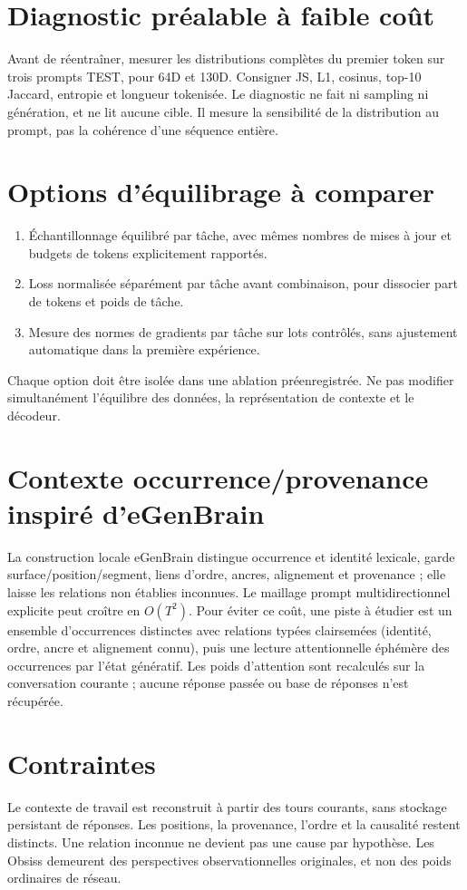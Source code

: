 \documentclass[11pt,a4paper]{report}
\begin{document}
\section{Diagnostic préalable à faible coût}
Avant de réentraîner, mesurer les distributions complètes du premier token sur trois prompts TEST, pour 64D et 130D. Consigner JS, L1, cosinus, top-10 Jaccard, entropie et longueur tokenisée. Le diagnostic ne fait ni sampling ni génération, et ne lit aucune cible. Il mesure la sensibilité de la distribution au prompt, pas la cohérence d'une séquence entière.
\section{Options d'équilibrage à comparer}
\begin{enumerate}
\item Échantillonnage équilibré par tâche, avec mêmes nombres de mises à jour et budgets de tokens explicitement rapportés.
\item Loss normalisée séparément par tâche avant combinaison, pour dissocier part de tokens et poids de tâche.
\item Mesure des normes de gradients par tâche sur lots contrôlés, sans ajustement automatique dans la première expérience.
\end{enumerate}
Chaque option doit être isolée dans une ablation préenregistrée. Ne pas modifier simultanément l'équilibre des données, la représentation de contexte et le décodeur.
\section{Contexte occurrence/provenance inspiré d'eGenBrain}
\begin{sloppypar}
La construction locale eGenBrain distingue occurrence et identité lexicale, garde surface/position/segment, liens d'ordre, ancres, alignement et provenance ; elle laisse les relations non établies inconnues.
Le maillage prompt multidirectionnel explicite peut croître en $O(T^2)$.
Pour éviter ce coût, une piste à étudier est un ensemble d'occurrences distinctes avec relations typées clairsemées (identité, ordre, ancre et alignement connu), puis une lecture attentionnelle éphémère des occurrences par l'état génératif.
Les poids d'attention sont recalculés sur la conversation courante ; aucune réponse passée ou base de réponses n'est récupérée.
\end{sloppypar}
\section{Contraintes}
Le contexte de travail est reconstruit à partir des tours courants, sans stockage persistant de réponses. Les positions, la provenance, l'ordre et la causalité restent distincts. Une relation inconnue ne devient pas une cause par hypothèse. Les Obsiss demeurent des perspectives observationnelles originales, et non des poids ordinaires de réseau.
\end{document}
